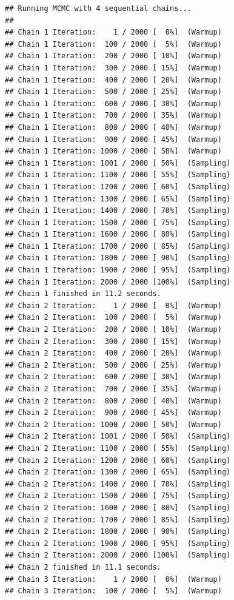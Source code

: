 \documentclass[
]{article}
\begin{document}
\begin{verbatim}
## Running MCMC with 4 sequential chains...
## 
## Chain 1 Iteration:    1 / 2000 [  0%]  (Warmup) 
## Chain 1 Iteration:  100 / 2000 [  5%]  (Warmup) 
## Chain 1 Iteration:  200 / 2000 [ 10%]  (Warmup) 
## Chain 1 Iteration:  300 / 2000 [ 15%]  (Warmup) 
## Chain 1 Iteration:  400 / 2000 [ 20%]  (Warmup) 
## Chain 1 Iteration:  500 / 2000 [ 25%]  (Warmup) 
## Chain 1 Iteration:  600 / 2000 [ 30%]  (Warmup) 
## Chain 1 Iteration:  700 / 2000 [ 35%]  (Warmup) 
## Chain 1 Iteration:  800 / 2000 [ 40%]  (Warmup) 
## Chain 1 Iteration:  900 / 2000 [ 45%]  (Warmup) 
## Chain 1 Iteration: 1000 / 2000 [ 50%]  (Warmup) 
## Chain 1 Iteration: 1001 / 2000 [ 50%]  (Sampling) 
## Chain 1 Iteration: 1100 / 2000 [ 55%]  (Sampling) 
## Chain 1 Iteration: 1200 / 2000 [ 60%]  (Sampling) 
## Chain 1 Iteration: 1300 / 2000 [ 65%]  (Sampling) 
## Chain 1 Iteration: 1400 / 2000 [ 70%]  (Sampling) 
## Chain 1 Iteration: 1500 / 2000 [ 75%]  (Sampling) 
## Chain 1 Iteration: 1600 / 2000 [ 80%]  (Sampling) 
## Chain 1 Iteration: 1700 / 2000 [ 85%]  (Sampling) 
## Chain 1 Iteration: 1800 / 2000 [ 90%]  (Sampling) 
## Chain 1 Iteration: 1900 / 2000 [ 95%]  (Sampling) 
## Chain 1 Iteration: 2000 / 2000 [100%]  (Sampling) 
## Chain 1 finished in 11.2 seconds.
## Chain 2 Iteration:    1 / 2000 [  0%]  (Warmup) 
## Chain 2 Iteration:  100 / 2000 [  5%]  (Warmup) 
## Chain 2 Iteration:  200 / 2000 [ 10%]  (Warmup) 
## Chain 2 Iteration:  300 / 2000 [ 15%]  (Warmup) 
## Chain 2 Iteration:  400 / 2000 [ 20%]  (Warmup) 
## Chain 2 Iteration:  500 / 2000 [ 25%]  (Warmup) 
## Chain 2 Iteration:  600 / 2000 [ 30%]  (Warmup) 
## Chain 2 Iteration:  700 / 2000 [ 35%]  (Warmup) 
## Chain 2 Iteration:  800 / 2000 [ 40%]  (Warmup) 
## Chain 2 Iteration:  900 / 2000 [ 45%]  (Warmup) 
## Chain 2 Iteration: 1000 / 2000 [ 50%]  (Warmup) 
## Chain 2 Iteration: 1001 / 2000 [ 50%]  (Sampling) 
## Chain 2 Iteration: 1100 / 2000 [ 55%]  (Sampling) 
## Chain 2 Iteration: 1200 / 2000 [ 60%]  (Sampling) 
## Chain 2 Iteration: 1300 / 2000 [ 65%]  (Sampling) 
## Chain 2 Iteration: 1400 / 2000 [ 70%]  (Sampling) 
## Chain 2 Iteration: 1500 / 2000 [ 75%]  (Sampling) 
## Chain 2 Iteration: 1600 / 2000 [ 80%]  (Sampling) 
## Chain 2 Iteration: 1700 / 2000 [ 85%]  (Sampling) 
## Chain 2 Iteration: 1800 / 2000 [ 90%]  (Sampling) 
## Chain 2 Iteration: 1900 / 2000 [ 95%]  (Sampling) 
## Chain 2 Iteration: 2000 / 2000 [100%]  (Sampling) 
## Chain 2 finished in 11.1 seconds.
## Chain 3 Iteration:    1 / 2000 [  0%]  (Warmup) 
## Chain 3 Iteration:  100 / 2000 [  5%]  (Warmup) 

\end{verbatim}
\end{document}

